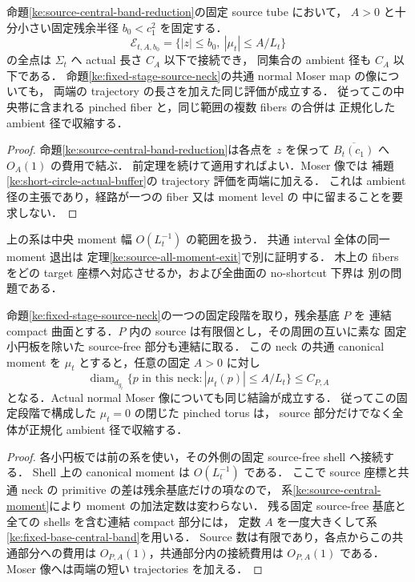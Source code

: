 \begin{corollary}
\label{ke:source-central-band-collapse}
命題\ref{ke:source-central-band-reduction}の固定 source tube において，
$A>0$ と十分小さい固定残余半径 $b_0<c_1^2$ を固定する．
\[
 \mathcal E_{t,A,b_0}
 =\{|z|\le b_0,\ |\mu_t|\le A/L_t\}
\]
の全点は $\Sigma_t$ へ actual 長さ $C_A$ 以下で接続でき，
同集合の ambient 径も $C_A$ 以下である．
命題\ref{ke:fixed-stage-source-neck}の共通 normal Moser map の像についても，
両端の trajectory の長さを加えた同じ評価が成立する．
従ってこの中央帯に含まれる pinched fiber と，同じ範囲の複数 fibers の合併は
正規化した ambient 径で収縮する．
\end{corollary}

\begin{proof}
命題\ref{ke:source-central-band-reduction}は各点を $z$ を保って
$\overline{B_t(c_1)}$ へ $O_A(1)$ の費用で結ぶ．
前定理を続けて適用すればよい．Moser 像では
補題\ref{ke:short-circle-actual-buffer}の trajectory 評価を両端に加える．
これは ambient 径の主張であり，経路が一つの fiber 又は moment level の
中に留まることを要求しない．
\end{proof}

上の系は中央 moment 幅 $O(L_t^{-1})$ の範囲を扱う．
共通 interval 全体の同一 moment 退出は
定理\ref{ke:source-all-moment-exit}で別に証明する．
木上の fibers をどの target 座標へ対応させるか，および全曲面の no-shortcut 下界は
別の問題である．

\begin{corollary}
\label{ke:fixed-base-source-central-band}
命題\ref{ke:fixed-stage-source-neck}の一つの固定段階を取り，残余基底 $P$ を
連結 compact 曲面とする．$P$ 内の source は有限個とし，その周囲の互いに素な
固定小円板を除いた source-free 部分も連結に取る．
この neck の共通 canonical moment を $\mu_t$ とすると，任意の固定 $A>0$ に対し
\[
 \operatorname{diam}_{d_{g_t}}
 \{p\text{ in this neck}:|\mu_t(p)|\le A/L_t\}
 \le C_{P,A}
\]
となる．Actual normal Moser 像についても同じ結論が成立する．
従ってこの固定段階で構成した $\mu_t=0$ の閉じた pinched torus は，
source 部分だけでなく全体が正規化 ambient 径で収縮する．
\end{corollary}

\begin{proof}
各小円板では前の系を使い，その外側の固定 source-free shell へ接続する．
Shell 上の canonical moment は $O(L_t^{-1})$ である．
ここで source 座標と共通 neck の primitive の差は残余基底だけの項なので，
系\ref{ke:source-central-moment}により moment の加法定数は変わらない．
残る固定 source-free 基底と全ての shells を含む連結 compact 部分には，
定数 $A$ を一度大きくして系\ref{ke:fixed-base-central-band}を用いる．
Source 数は有限であり，各点からこの共通部分への費用は
$O_{P,A}(1)$，共通部分内の接続費用は $O_{P,A}(1)$ である．
Moser 像へは両端の短い trajectories を加える．
\end{proof}
